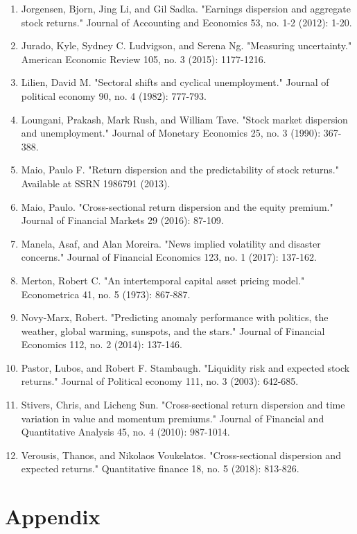 \documentclass[12pt]{article}
\begin{document}
\begin{enumerate}
    \item{Jorgensen, Bjorn, Jing Li, and Gil Sadka. "Earnings dispersion and aggregate stock returns." Journal of Accounting and Economics 53, no. 1-2 (2012): 1-20.}
    \item{Jurado, Kyle, Sydney C. Ludvigson, and Serena Ng. "Measuring uncertainty." American Economic Review 105, no. 3 (2015): 1177-1216.}
    \item{Lilien, David M. "Sectoral shifts and cyclical unemployment." Journal of political economy 90, no. 4 (1982): 777-793.}
    \item{Loungani, Prakash, Mark Rush, and William Tave. "Stock market dispersion and unemployment." Journal of Monetary Economics 25, no. 3 (1990): 367-388.}
    \item{Maio, Paulo F. "Return dispersion and the predictability of stock returns." Available at SSRN 1986791 (2013).}
    \item{Maio, Paulo. "Cross-sectional return dispersion and the equity premium." Journal of Financial Markets 29 (2016): 87-109.}
    \item{Manela, Asaf, and Alan Moreira. "News implied volatility and disaster concerns." Journal of Financial Economics 123, no. 1 (2017): 137-162.}
    \item{Merton, Robert C. "An intertemporal capital asset pricing model." Econometrica 41, no. 5 (1973): 867-887.}
    \item{Novy-Marx, Robert. "Predicting anomaly performance with politics, the weather, global warming, sunspots, and the stars." Journal of Financial Economics 112, no. 2 (2014): 137-146.}
    \item{Pastor, Lubos, and Robert F. Stambaugh. "Liquidity risk and expected stock returns." Journal of Political economy 111, no. 3 (2003): 642-685.}
    \item{Stivers, Chris, and Licheng Sun. "Cross-sectional return dispersion and time variation in value and momentum premiums." Journal of Financial and Quantitative Analysis 45, no. 4 (2010): 987-1014.}
    \item{Verousis, Thanos, and Nikolaos Voukelatos. "Cross-sectional dispersion and expected returns." Quantitative finance 18, no. 5 (2018): 813-826.}

\end{enumerate}

\newpage


\section*{Appendix}
\end{document}

